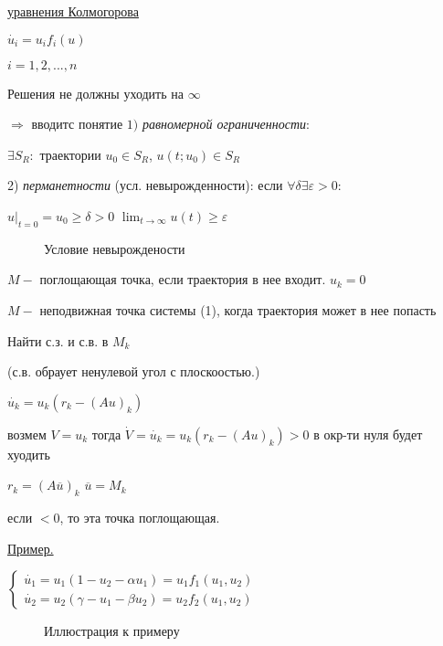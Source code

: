 \documentclass[oneside, final, 12pt]{article}
\begin{document}
\begin{large}
\vspace{0.5cm}
\underline{уравнения Колмогорова}

\vspace{0.5cm}
\(
\dot{u_i} = u_if_i(u)
\)

\(
i = 1,2,...,n
\)

\vspace{0.5cm}
Решения не должны уходить на $\infty$ 

$\Rightarrow$ вводитс понятие $1)$ \textit{равномерной ограниченности}:

$\exists S_R : $ траектории $u_0 \in S_R$, \hspace{0.2cm} $u(t;u_0) \in S_R$

2) \textit{перманетности} (усл. невырожденности): если $\forall\delta \exists\varepsilon > 0:$

$u|_{t=0} = u_0 \geq \delta > 0$ \hspace{0.2cm} $\lim_{t \to \infty} u(t) \geq\varepsilon$

\vspace{0.5cm}

\begin{figure} [h!]
			\caption{Условие невырождености}	
\end{figure}

$M - $ поглощающая точка, если траектория в нее входит. $u_k=0$

$M -$ неподвижная точка системы (1), когда траектория может в нее попасть

Найти с.з. и с.в. в $M_k$

(с.в. обраует ненулевой угол с плоскоостью.)


$\dot{u_k} = u_k(r_k - (Au)_k)$

возмем $ V = u_k$
тогда $ \dot{V} = \dot{u_k} = u_k(r_k - (Au)_k) > 0$\hspace{0.2cm} в окр-ти нуля будет хуодить

$r_k = (A\overline{u})_k$ \hspace{0.2cm} $\overline{u} = M_k$

если $<0$, то эта точка поглощающая.

\underline{Пример.}

\vspace{0.5cm}
\(
	\begin{cases}
	\dot{u_1} = u_1(1-u_2-\alpha u_1) = u_1 f_1(u_1,u_2)
	\\
	\dot{u_2} = u_2(\gamma - u_1 - \beta u_2) = u_2f_2(u_1,u_2)
	\end{cases}
\)
\begin{figure} [h!]
			\caption{Иллюстрация к примеру}	
\end{figure}


\end{large}
\end{document}
